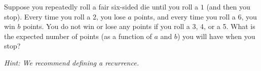 \item {}

Suppose you repeatedly roll a fair six-sided die until you roll a $1$ (and then
you stop). Every time you roll a $2$, you lose $a$ points, and every time you
roll a 6, you win $b$ points. You do not win or lose any points if you roll a 3,
4, or a 5. What is the expected number of points (as a function of $a$ and $b$)
you will have when you stop?

{\em Hint: We recommend defining a recurrence.}
